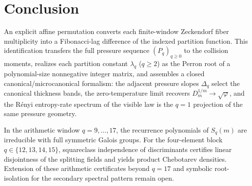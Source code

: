 \section{Conclusion}\label{sec:conclusion}

An explicit affine permutation converts each finite-window Zeckendorf fiber
multiplicity into a Fibonacci-lag difference of the indexed partition function.
This identification transfers the full pressure sequence $(P_q)_{q\ge 0}$ to
the collision moments, realizes each partition constant $\lambda_q$ ($q\ge 2$)
as the Perron root of a polynomial-size nonnegative integer matrix, and
assembles a closed canonical/microcanonical formalism: the adjacent pressure
slopes $\Delta_q$ select the canonical thickness bands, the zero-temperature
limit recovers $D_m^{1/m}\to\sqrt{\varphi}$, and the R\'enyi entropy-rate
spectrum of the visible law is the $q=1$ projection of the same pressure
geometry.

In the arithmetic window $q=9,\dots,17$, the recurrence polynomials of
$S_q(m)$ are irreducible with full symmetric Galois groups.  For the
four-element block $q\in\{12,13,14,15\}$, squareclass independence of
discriminants certifies linear disjointness of the splitting fields and
yields product Chebotarev densities.  Extension of these arithmetic
certificates beyond $q=17$ and symbolic root-isolation for the secondary
spectral pattern remain open.

